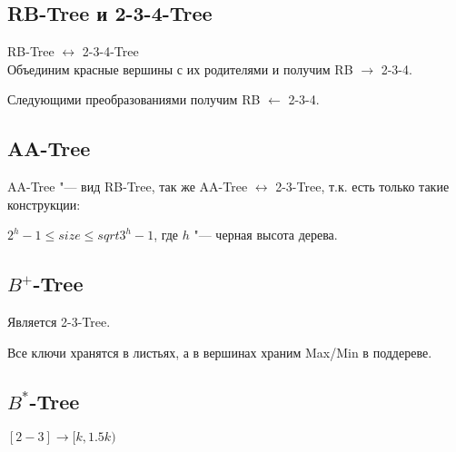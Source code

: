 
\subsection{RB-Tree и 2-3-4-Tree}

RB-Tree $\longleftrightarrow$ 2-3-4-Tree\\
Объединим красные вершины с их родителями и получим RB $\longrightarrow$ 2-3-4.


Следующими преобразованиями получим RB $\longleftarrow$ 2-3-4.


\subsection{AA-Tree}

AA-Tree "--- вид RB-Tree, так же  AA-Tree $\longleftrightarrow$ 2-3-Tree, т.к. есть только такие конструкции:


$2^{h} - 1 \leqslant size \leqslant sqrt{3}^{h} - 1$, где $h$ "--- черная высота дерева.\\

\subsection{\texorpdfstring{$B^+$}{B+}-Tree}

Является 2-3-Tree.

Все ключи хранятся в листьях, а в вершинах храним Max/Min в поддереве.\\

\subsection{\texorpdfstring{$B^*$}{B*}-Tree}

$[2-3] \longrightarrow [k, 1.5k )$
